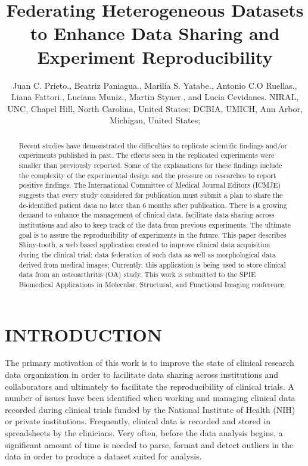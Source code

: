 \documentclass[]{spie}  %
\title{Federating Heterogeneous Datasets to Enhance Data Sharing and Experiment Reproducibility}
\author{Juan C. Prieto.\supit{a}, Beatriz Paniagua.\supit{a}, Marilia S. Yatabe.\supit{b}, Antonio C.O Ruellas.\supit{b}, 
Liana Fattori.\supit{b}, Luciana Muniz.\supit{b}, Martin Styner.\supit{a}, and Lucia Cevidanes.\supit{c}
\skiplinehalf
\supit{a}NIRAL, UNC, Chapel Hill, North Carolina, United States; 
\supit{b}DCBIA, UMICH, Ann Arbor, Michigan, United States;
}
\begin{document}
 
  \maketitle 

\begin{abstract}

Recent studies have demonstrated the difficulties to replicate scientific findings and/or experiments published in past\cite{open2015estimating}. 
The effects seen in the replicated experiments were smaller than previously reported. Some of the explanations 
for these findings include the complexity of the experimental design and the pressure on researches to report positive findings. 
The International Committee of Medical Journal Editors (ICMJE) suggests that every study considered for publication must 
submit a plan to share the de-identified patient data no later than 6 months after publication. 
There is a growing demand to enhance the management of clinical data, facilitate data sharing across institutions and also to keep track 
of the data from previous experiments. The ultimate goal is to assure the reproducibility of experiments in the future.
This paper describes Shiny-tooth, a web based application created to improve clinical data acquisition during the clinical trial; 
data federation of such data as well as morphological data derived from medical images; 
Currently, this application is being used to store clinical data from an osteoarthritis (OA) study. 
This work is submitted to the SPIE Biomedical Applications in Molecular, Structural, and Functional Imaging conference.

\end{abstract}



\section{INTRODUCTION}
\label{sec:intro}

The primary motivation of this work is to improve the state of clinical research data organization in order to facilitate data sharing across institutions and collaborators and ultimately to facilitate the reproducibility of clinical trials.
A number of issues have been identified when working and managing clinical data recorded during clinical trials funded by the National Institute of Health 
(NIH) or private institutions. Frequently, clinical data is recorded and stored in spreadsheets by the clinicians. Very often, before the data analysis begins, 
a significant amount of time is needed to parse, format and detect outliers in the data in order to produce a dataset suited for analysis.
\end{document}
